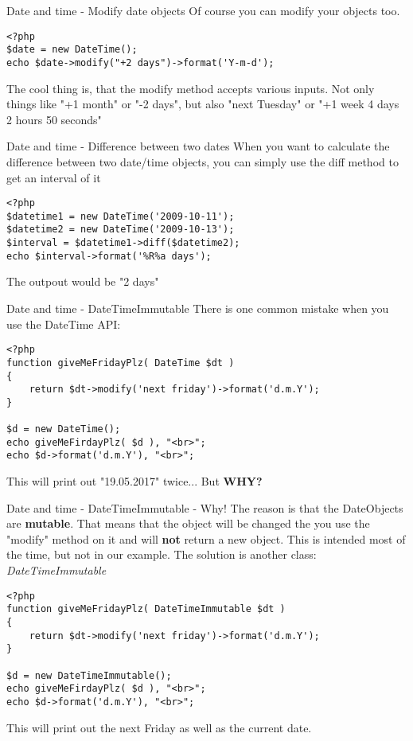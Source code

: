 \begin{frame}[fragile]{Date and time - Modify date objects}
Of course you can modify your objects too. \pause

\begin{lstlisting}
<?php
$date = new DateTime();
echo $date->modify("+2 days")->format('Y-m-d');
\end{lstlisting}
\pause
The cool thing is, that the modify method accepts various inputs. Not only things like "+1 month" or "-2 days", but also "next Tuesday" or "+1 week 4 days 2 hours 50 seconds"
\end{frame}


\begin{frame}[fragile]{Date and time - Difference between two dates}
When you want to calculate the difference between two date/time objects, you can simply use the diff method to get an interval of it\pause

\begin{lstlisting}
<?php
$datetime1 = new DateTime('2009-10-11');
$datetime2 = new DateTime('2009-10-13');
$interval = $datetime1->diff($datetime2);
echo $interval->format('%R%a days');
\end{lstlisting}

\pause The outpout would be "2 days"
\end{frame}

\begin{frame}[fragile]{Date and time - DateTimeImmutable}
There is one common mistake when you use the DateTime API: \pause
\begin{lstlisting}
<?php
function giveMeFridayPlz( DateTime $dt )
{
    return $dt->modify('next friday')->format('d.m.Y');
}

$d = new DateTime();
echo giveMeFirdayPlz( $d ), "<br>";
echo $d->format('d.m.Y'), "<br>";
\end{lstlisting}

This will print out "19.05.2017" twice... \pause
But \textbf{WHY?}
\end{frame}

\begin{frame}[fragile]{Date and time - DateTimeImmutable - Why!}
The reason is that the DateObjects are \textbf{mutable}. That means that the object will be changed the you use the "modify" method on it and will \textbf{not} return a new object. This is intended most of the time, but not in our example. \pause The solution is another class: \emph{DateTimeImmutable}
\begin{lstlisting}
<?php
function giveMeFridayPlz( DateTimeImmutable $dt )
{
    return $dt->modify('next friday')->format('d.m.Y');
}

$d = new DateTimeImmutable();
echo giveMeFirdayPlz( $d ), "<br>";
echo $d->format('d.m.Y'), "<br>";
\end{lstlisting}

This will print out the next Friday as well as the current date.
\end{frame}

